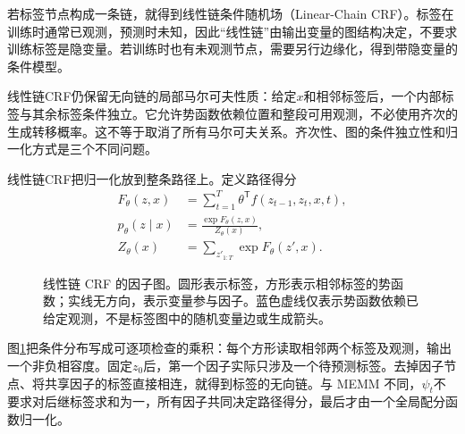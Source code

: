 若标签节点构成一条链，就得到线性链条件随机场（Linear-Chain CRF）。标签在训练时通常已观测，预测时未知，因此“线性链”由输出变量的图结构决定，不要求训练标签是隐变量。若训练时也有未观测节点，需要另行边缘化，得到带隐变量的条件模型。

线性链CRF仍保留无向链的局部马尔可夫性质：给定$x$和相邻标签后，一个内部标签与其余标签条件独立。它允许势函数依赖位置和整段可用观测，不必使用齐次的生成转移概率。这不等于取消了所有马尔可夫关系。齐次性、图的条件独立性和归一化方式是三个不同问题。

线性链CRF把归一化放到整条路径上。定义路径得分
\begin{align}
 F_\theta(z,x)&=\sum_{t=1}^{T}\theta^{\mathsf T}f(z_{t-1},z_t,x,t),\\
 p_\theta(z\mid x)&=\frac{\exp F_\theta(z,x)}{Z_\theta(x)},\\
 Z_\theta(x)&=\sum_{z'_{1:T}}\exp F_\theta(z',x).
\end{align}
\begin{figure}[htbp]
\centering
{}
\caption{线性链 CRF 的因子图。圆形表示标签，方形表示相邻标签的势函数；实线无方向，表示变量参与因子。蓝色虚线仅表示势函数依赖已给定观测，不是标签图中的随机变量边或生成箭头。}
\label{fig:bayes-crf-structure}
\end{figure}
图\ref{fig:bayes-crf-structure}把条件分布写成可逐项检查的乘积：每个方形读取相邻两个标签及观测，输出一个非负相容度。固定$z_0$后，第一个因子实际只涉及一个待预测标签。去掉因子节点、将共享因子的标签直接相连，就得到标签的无向链。与 MEMM 不同，$\psi_t$不要求对后继标签求和为一，所有因子共同决定路径得分，最后才由一个全局配分函数归一化。

